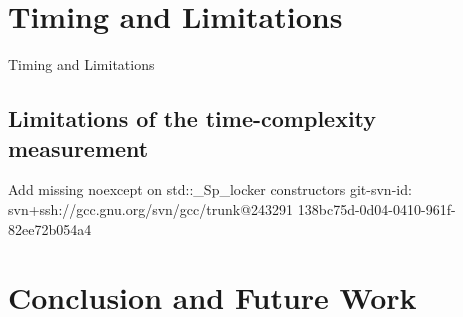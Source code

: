 \documentclass{sig-alternate}
\begin{document}
\section{Timing and Limitations}
Timing and Limitations
\subsection{Limitations of the time-complexity measurement}

Add missing noexcept on std::_Sp_locker constructors
git-svn-id: svn+ssh://gcc.gnu.org/svn/gcc/trunk@243291 138bc75d-0d04-0410-961f-82ee72b054a4

\section{Conclusion and Future Work}


{\small

}
\end{document}
